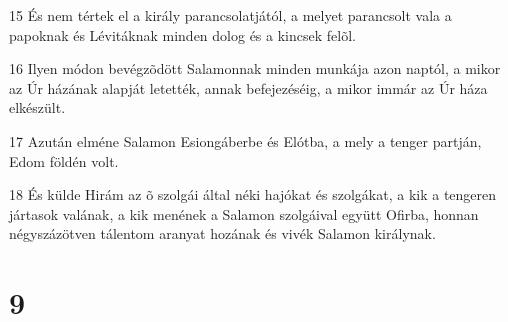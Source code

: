 \par 15 És nem tértek el a király parancsolatjától, a melyet parancsolt vala a papoknak és Lévitáknak minden dolog és a kincsek felõl.
\par 16 Ilyen módon bevégzõdött Salamonnak minden munkája azon naptól, a mikor az Úr házának alapját letették, annak befejezéséig, a mikor immár az Úr háza elkészült.
\par 17 Azután elméne Salamon Esiongáberbe és Elótba, a mely a tenger partján, Edom földén volt.
\par 18 És külde Hirám az õ szolgái által néki hajókat és szolgákat, a kik a tengeren jártasok valának, a kik menének a Salamon szolgáival együtt Ofirba, honnan négyszázötven tálentom aranyat hozának és vivék Salamon királynak.

\chapter{9}

